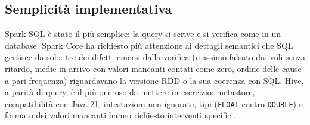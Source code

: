 \documentclass[11pt,a4paper]{article}
\newcommand{\code}[1]{\texttt{#1}}
\begin{document}
\begin{table}[H]
\centering\small

\caption{Righe di codice significative per job (escluse righe vuote, commenti e stampe di servizio).}
\label{tab:loc}
\end{table}

\subsection{Semplicità implementativa}
Spark SQL è stato il più semplice: la query si scrive e si verifica come in un database. Spark Core ha richiesto più
attenzione ai dettagli semantici che SQL gestisce da solo: tre dei difetti emersi dalla verifica (massimo falsato dai
voli senza ritardo, medie in arrivo con valori mancanti contati come zero, ordine delle cause a pari frequenza)
riguardavano la versione RDD o la sua coerenza con SQL. Hive, a parità di query, è il più oneroso da mettere in
esercizio: metastore, compatibilità con Java 21, intestazioni non ignorate, tipi (\code{FLOAT} contro
\code{DOUBLE}) e formato dei valori mancanti hanno richiesto interventi specifici.
\end{document}
